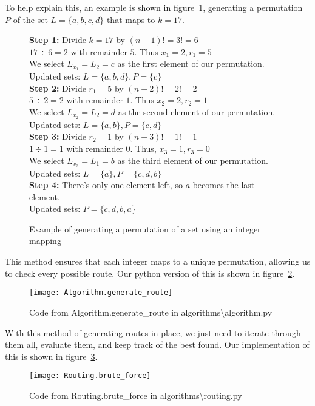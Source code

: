 \noindent
To help explain this, an example is shown in figure~\ref{fig:permutation-calculation-example}, generating a
permutation $P$ of the set $L = \{a, b, c, d\}$ that maps to $k = 17$.
\begin{figure}[H]
    \textbf{Step 1:} Divide $k = 17$ by $(n-1)! = 3! = 6$\\
    $17 \div 6 = 2$ with remainder $5$. Thus $x_1 = 2, r_1 = 5$\\
    We select $L_{x_1} = L_2 = c$ as the first element of our permutation.\\
    Updated sets: $L = \{a, b, d\}, P = \{c\}$\\

    \textbf{Step 2:} Divide $r_1 = 5$ by $(n-2)! = 2! = 2$\\
    $5 \div 2 = 2$ with remainder $1$. Thus $x_2 = 2, r_2 = 1$\\
    We select $L_{x_2} = L_2 = d$ as the second element of our permutation.\\
    Updated sets: $L = \{a, b\}, P = \{c, d\}$\\

    \textbf{Step 3:} Divide $r_2 = 1$ by $(n-3)! = 1! = 1$\\
    $1 \div 1 = 1$ with remainder $0$. Thus, $x_3 = 1, r_3 = 0$\\
    We select $L_{x_3} = L_1 = b$ as the third element of our permutation.\\
    Updated sets: $L = \{a\}, P = \{c, d, b\}$\\

    \textbf{Step 4:} There's only one element left, so $a$ becomes the last element.\\
    Updated sets: $P = \{c, d, b, a\}$
    \caption{Example of generating a permutation of a set using an integer mapping}
    \label{fig:permutation-calculation-example}
\end{figure}

\noindent
This method ensures that each integer maps to a unique permutation, allowing us to check every possible route.
Our python version of this is shown in figure~\ref{fig:Algorithm.generate_route}.
\begin{figure}[H]
    \centering
    \texttt{[image: Algorithm.generate\_route]}
    \caption{Code from Algorithm.generate\_route in algorithms\textbackslash algorithm.py}
    \label{fig:Algorithm.generate_route}
\end{figure}

\noindent
With this method of generating routes in place, we just need to iterate through them all, evaluate them, and keep
track of the best found.
Our implementation of this is shown in figure~\ref{fig:Routing.brute_force}.
\begin{figure}[H]
    \centering
    \texttt{[image: Routing.brute\_force]}
    \caption{Code from Routing.brute\_force in algorithms\textbackslash routing.py}
    \label{fig:Routing.brute_force}
\end{figure}

